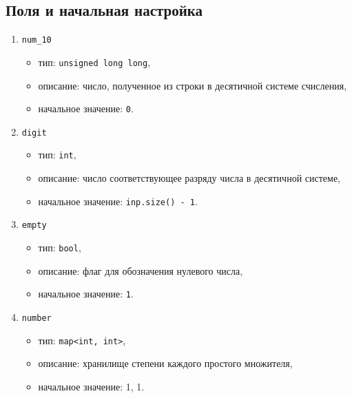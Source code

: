 \subsection*{Поля и начальная настройка}
\begin{enumerate}
	\item \texttt{num\_10}
	\begin{itemize}
		\item тип: \texttt{unsigned long long},
		\item описание: число, полученное из строки в десятичной системе счисления,
		\item начальное значение: \texttt{0}.
	\end{itemize}
	
	\item \texttt{digit}
	\begin{itemize}
		\item тип: \texttt{int},
		\item описание: число соответствующее разряду числа в десятичной системе,
		\item начальное значение: \texttt{inp.size() - 1}.
	\end{itemize}
	
	\item \texttt{empty}
	\begin{itemize}
		\item тип: \texttt{bool},
		\item описание: флаг для обозначения нулевого числа,
		\item начальное значение: \texttt{1}.
	\end{itemize}
	
	\item \texttt{number}
	\begin{itemize}
		\item тип: \texttt{map<int, int>},
		\item описание: хранилище степени каждого простого множителя,
		\item начальное значение: {1, 1}.
	\end{itemize}
\end{enumerate}

